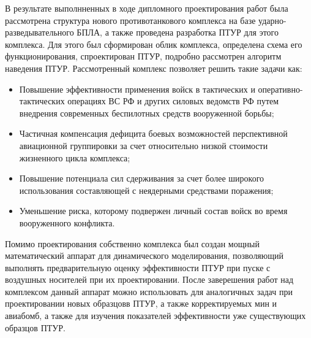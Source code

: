 \Conclusion %

В результате выполнненных в ходе дипломного проектирования работ была рассмотрена структура нового противотанкового комплекса на базе ударно-разведывательного БПЛА, а также проведена разработка ПТУР для этого комплекса.
Для этого был сформирован облик комплекса, определена схема его функционирования, спроектирован ПТУР, подробно рассмотрен алгоритм наведения ПТУР.
Рассмотренный комплекс позволяет решить такие задачи как:
\begin{itemize}
 \item Повышение эффективности применения войск в тактических и оперативно-тактических операциях ВС РФ и других силовых ведомств РФ путем внедрения современных беспилотных средств вооруженной борьбы;
 \item Частичная компенсация дефицита боевых возможностей перспективной авиационной группировки за счет относительно низкой стоимости жизненного цикла комплекса;
 \item Повышение потенциала сил сдерживания за счет более широкого использования составляющей с неядерными средствами поражения;
 \item Уменьшение риска, которому подвержен личный состав войск во время вооруженного конфликта.
\end{itemize}

Помимо проектирования собственно комплекса был создан мощный математический аппарат для динамического моделирования, позволяющий выполнять предварительную оценку эффективности ПТУР при пуске с воздушных носителей при их проектировании.
После заверешения работ над комплексом данный аппарат можно использовать для аналогичных задач при проектировании новых образцовв ПТУР, а также корректируемых мин и авиабомб, а также для изучения показателей эффективности уже существующих образцов ПТУР.
